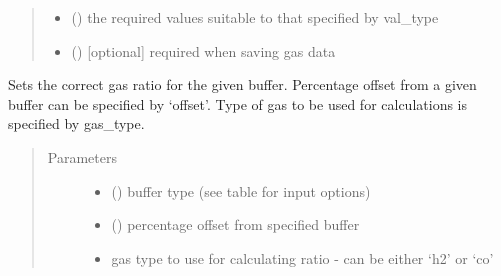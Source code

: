 \documentclass[letterpaper,10pt,english]{sphinxmanual}
\begin{document}
\begin{fulllineitems}
\begin{fulllineitems}
\begin{quote}
\begin{description}
\begin{itemize}
\item {} 
 () \textendash{} the required values suitable to that specified by val\_type

\item {} 
 () \textendash{} {[}optional{]} required when saving gas data

\end{itemize}

\end{description}\end{quote}

\end{fulllineitems}


\begin{fulllineitems}
\label{\detokenize{source/laboratory:laboratory.setup.Setup.set_fugacity}}
Sets the correct gas ratio for the given buffer. Percentage offset from a given buffer can be specified by ‘offset’. Type of gas to be used for calculations is specified by gas\_type.
\begin{quote}\begin{description}
\item[{Parameters}] \leavevmode\begin{itemize}
\item {} 
 () \textendash{} buffer type (see table for input options)

\item {} 
 (\sphinxstyleliteralemphasis{\sphinxupquote{, }}) \textendash{} percentage offset from specified buffer

\item {} 
 \textendash{} gas type to use for calculating ratio - can be either ‘h2’ or ‘co’

\end{itemize}


\end{description}
\end{quote}
\end{fulllineitems}
\end{fulllineitems}
\end{document}
